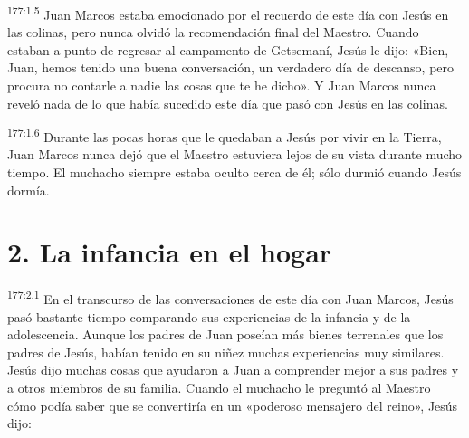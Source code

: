 \par
\textsuperscript{177:1.5} Juan Marcos estaba emocionado por el recuerdo de este día con Jesús en las colinas, pero nunca olvidó la recomendación final del Maestro. Cuando estaban a punto de regresar al campamento de Getsemaní, Jesús le dijo: «Bien, Juan, hemos tenido una buena conversación, un verdadero día de descanso, pero procura no contarle a nadie las cosas que te he dicho». Y Juan Marcos nunca reveló nada de lo que había sucedido este día que pasó con Jesús en las colinas.

\par
\textsuperscript{177:1.6} Durante las pocas horas que le quedaban a Jesús por vivir en la Tierra, Juan Marcos nunca dejó que el Maestro estuviera lejos de su vista durante mucho tiempo. El muchacho siempre estaba oculto cerca de él; sólo durmió cuando Jesús dormía.

\section*{2. La infancia en el hogar}
\par
\textsuperscript{177:2.1} En el transcurso de las conversaciones de este día con Juan Marcos, Jesús pasó bastante tiempo comparando sus experiencias de la infancia y de la adolescencia. Aunque los padres de Juan poseían más bienes terrenales que los padres de Jesús, habían tenido en su niñez muchas experiencias muy similares. Jesús dijo muchas cosas que ayudaron a Juan a comprender mejor a sus padres y a otros miembros de su familia. Cuando el muchacho le preguntó al Maestro cómo podía saber que se convertiría en un «poderoso mensajero del reino», Jesús dijo:

